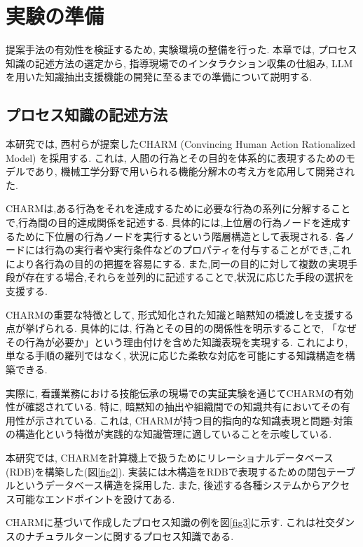 \chapter{実験の準備}
提案手法の有効性を検証するため, 実験環境の整備を行った. 本章では, プロセス知識の記述方法の選定から, 指導現場でのインタラクション収集の仕組み, LLMを用いた知識抽出支援機能の開発に至るまでの準備について説明する. 

\section{プロセス知識の記述方法}
本研究では, 西村らが提案したCHARM (Convincing Human Action Rationalized Model) \cite{Nishimura2008, Nishimura2015}を採用する. これは, 人間の行為とその目的を体系的に表現するためのモデルであり, 機械工学分野で用いられる機能分解木の考え方を応用して開発された.

CHARMは,ある行為をそれを達成するために必要な行為の系列に分解することで,行為間の目的達成関係を記述する. 具体的には,上位層の行為ノードを達成するために下位層の行為ノードを実行するという階層構造として表現される. 各ノードには行為の実行者や実行条件などのプロパティを付与することができ,これにより各行為の目的の把握を容易にする. また,同一の目的に対して複数の実現手段が存在する場合,それらを並列的に記述することで,状況に応じた手段の選択を支援する. 

CHARMの重要な特徴として, 形式知化された知識と暗黙知の橋渡しを支援する点が挙げられる. 具体的には, 行為とその目的の関係性を明示することで, 「なぜその行為が必要か」という理由付けを含めた知識表現を実現する. これにより, 単なる手順の羅列ではなく, 状況に応じた柔軟な対応を可能にする知識構造を構築できる.

実際に, 看護業務における技能伝承の現場での実証実験を通じてCHARMの有効性が確認されている. 特に, 暗黙知の抽出や組織間での知識共有においてその有用性が示されている. これは, CHARMが持つ目的指向的な知識表現と問題-対策の構造化という特徴が実践的な知識管理に適していることを示唆している.

本研究では, CHARMを計算機上で扱うためにリレーショナルデータベース(RDB)を構築した(図\ref{fig2}). 実装には木構造をRDBで表現するための閉包テーブルというデータベース構造を採用した. また, 後述する各種システムからアクセス可能なエンドポイントを設けてある.

CHARMに基づいて作成したプロセス知識の例を図\ref{fig3}に示す. これは社交ダンスのナチュラルターンに関するプロセス知識である.

